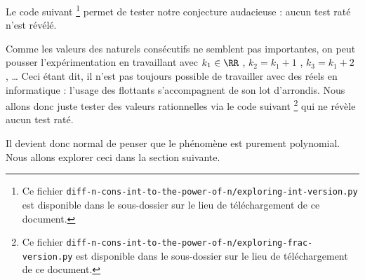 Le code suivant
\footnote{
	Ce fichier \texttt{diff-n-cons-int-to-the-power-of-n/exploring-int-version.py} est disponible dans le sous-dossier sur le lieu de téléchargement de ce document.
}
permet de tester notre conjecture audacieuse : aucun test raté n'est révélé.

\medskip





Comme les valeurs des naturels consécutifs ne semblent pas importantes, on peut pousser l'expérimentation en travaillant avec $k_1 \in \RR$ , $k_2 = k_1 + 1$ , $k_3 = k_1 + 2$ , \dots
Ceci étant dit, il n'est pas toujours possible de travailler avec des réels en informatique : l'usage des flottants s'accompagnent de son lot d'arrondis.
Nous allons donc juste tester des valeurs rationnelles via le code suivant
\footnote{
	Ce fichier \texttt{diff-n-cons-int-to-the-power-of-n/exploring-frac-version.py} est disponible dans le sous-dossier sur le lieu de téléchargement de ce document.
}
qui ne révèle aucun test raté.

\medskip



Il devient donc normal de penser que le phénomène est purement polynomial. Nous allons explorer ceci dans la section suivante.
